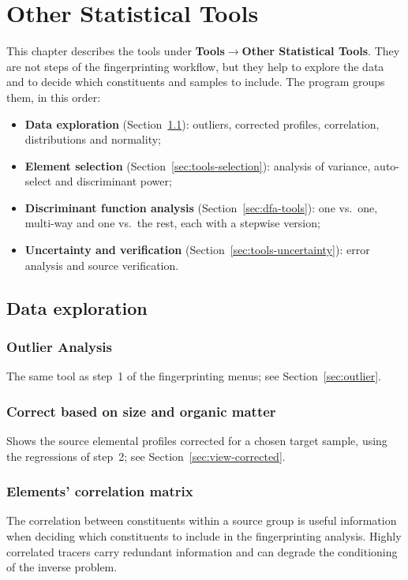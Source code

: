 \documentclass[12pt]{report}
\begin{document}
\chapter{Other Statistical Tools}\label{chap:other-tools}
This chapter describes the tools under \textbf{Tools}$\rightarrow$\textbf{Other Statistical Tools}. They are not steps of the fingerprinting workflow, but they help to explore the data and to decide which constituents and samples to include. The program groups them, in this order:
\begin{itemize}
    \item \textbf{Data exploration} (Section~\ref{sec:tools-exploration}): outliers, corrected profiles, correlation, distributions and normality;
    \item \textbf{Element selection} (Section~\ref{sec:tools-selection}): analysis of variance, auto-select and discriminant power;
    \item \textbf{Discriminant function analysis} (Section~\ref{sec:dfa-tools}): one vs.\ one, multi-way and one vs.\ the rest, each with a stepwise version;
    \item \textbf{Uncertainty and verification} (Section~\ref{sec:tools-uncertainty}): error analysis and source verification.
\end{itemize}

\section{Data exploration}\label{sec:tools-exploration}
\subsection{Outlier Analysis}
The same tool as step~1 of the fingerprinting menus; see Section~\ref{sec:outlier}.

\subsection{Correct based on size and organic matter}
Shows the source elemental profiles corrected for a chosen target sample, using the regressions of step~2; see Section~\ref{sec:view-corrected}.

\subsection{Elements' correlation matrix}\label{sec:tool-cormat}
The correlation between constituents within a source group is useful information when deciding which constituents to include in the fingerprinting analysis. Highly correlated tracers carry redundant information and can degrade the conditioning of the inverse problem.
\end{document}
